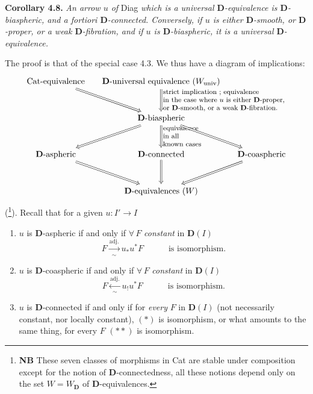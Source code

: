 \documentclass[11pt]{article}
\newcommand{\printedpage}[1]{\marginpar{\footnotesize p.~#1}}
\newcommand{\msp}[1]{\marginpar{\footnotesize [#1]}}
\newcommand{\D}{\mathbf{D}}
\begin{document}
\msp{page 65}

\textbf{Corollary 4.8.} \textit{An arrow $u$ of} Diag \textit{which is a universal $\D$-equivalence is $\D$-biaspheric, and \textup{a fortiori} $\D$-connected. Conversely, if $u$ is either $\D$-smooth, or $\D$-proper, or a weak $\D$-fibration, and if $u$ is $\D$-biaspheric, it is a universal $\D$-equivalence.}

The proof is that of the special case 4.3. We thus have a diagram of implications:
\[
\begin{tikzcd}[column sep=small, row sep=large]
\text{Cat-equivalence} \ar[dr, Rightarrow] & \D\text{-universal equivalence } (W_{\mathrm{univ}}) \ar[d, Rightarrow, "{\text{\footnotesize\begin{tabular}{@{}l@{}}strict implication ; equivalence\\ in the case where $u$ is either $\mathbf{D}$-proper,\\ or $\mathbf{D}$-smooth, or a weak $\mathbf{D}$-fibration.\end{tabular}}}"] & \\
 & \D\text{-biaspheric} \ar[dl, Rightarrow] \ar[d, Rightarrow, "{\text{\footnotesize\begin{tabular}{@{}l@{}}equivalence\\ in all\\ known cases\end{tabular}}}"] \ar[dr, Rightarrow] & \\
\D\text{-aspheric} \ar[dr, Rightarrow] & \D\text{-connected} \ar[d, Rightarrow] & \D\text{-coaspheric} \ar[dl, Rightarrow] \\
 & \D\text{-equivalences } (W) &
\end{tikzcd}
\]
(\footnote{\textbf{NB} These seven classes of morphisms in Cat are stable under composition except for the notion of $\D$-connectedness, all these notions depend only on the set $W = W_{\D}$ of $\D$-equivalences.}). Recall that for a given $u : I' \longrightarrow I$
\begin{enumerate}[leftmargin=*, labelindent=1.5em]
\item[a)] $u$ is $\D$-aspheric if and only if $\forall\, F$ \textit{constant} in $\D(I)$
\[
F \xrightarrow[\sim]{\text{adj.}} u_*u^*F \qquad\quad \text{is isomorphism.} \tag*{$(\ast)$}
\]
\printedpage{41}
\item[b)] $u$ is $\D$-coaspheric if and only if $\forall\, F$ \textit{constant} in $\D(I)$
\[
F \xleftarrow[\sim]{\text{adj.}} u_!u^*F \qquad\quad \text{is isomorphism.} \tag*{$(\ast\ast)$}
\]
\item[c)] $u$ is $\D$-connected if and only if for \textit{every} $F$ in $\D(I)$ (not necessarily constant, nor locally constant), $(\ast)$ is isomorphism, or what amounts to the same thing, for every $F$ $(\ast\ast)$ is isomorphism.
\end{enumerate}
\end{document}
